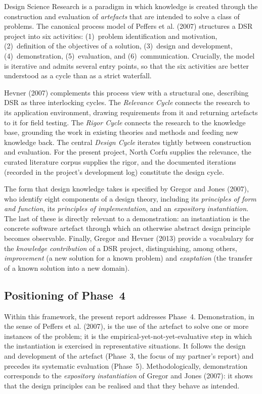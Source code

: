 \documentclass[11pt,a4paper]{article}
\begin{document}
Design Science Research is a paradigm in which knowledge is created through the construction and evaluation of \emph{artefacts} that are intended to solve a class of problems. The canonical process model of Peffers et al. (2007) structures a DSR project into six activities: (1)~problem identification and motivation, (2)~definition of the objectives of a solution, (3)~design and development, (4)~demonstration, (5)~evaluation, and (6)~communication. Crucially, the model is iterative and admits several entry points, so that the six activities are better understood as a cycle than as a strict waterfall.

Hevner (2007) complements this process view with a structural one, describing DSR as three interlocking cycles. The \emph{Relevance Cycle} connects the research to its application environment, drawing requirements from it and returning artefacts to it for field testing. The \emph{Rigor Cycle} connects the research to the knowledge base, grounding the work in existing theories and methods and feeding new knowledge back. The central \emph{Design Cycle} iterates tightly between construction and evaluation. For the present project, North Corfu supplies the relevance, the curated literature corpus supplies the rigor, and the documented iterations (recorded in the project's development log) constitute the design cycle.

The form that design knowledge takes is specified by Gregor and Jones (2007), who identify eight components of a design theory, including its \emph{principles of form and function}, its \emph{principles of implementation}, and an \emph{expository instantiation}. The last of these is directly relevant to a demonstration: an instantiation is the concrete software artefact through which an otherwise abstract design principle becomes observable. Finally, Gregor and Hevner (2013) provide a vocabulary for the \emph{knowledge contribution} of a DSR project, distinguishing, among others, \emph{improvement} (a new solution for a known problem) and \emph{exaptation} (the transfer of a known solution into a new domain).

\subsection{Positioning of Phase~4}

Within this framework, the present report addresses Phase~4. Demonstration, in the sense of Peffers et al. (2007), is the use of the artefact to solve one or more instances of the problem; it is the empirical-yet-not-yet-evaluative step in which the instantiation is exercised in representative situations. It follows the design and development of the artefact (Phase~3, the focus of my partner's report) and precedes its systematic evaluation (Phase~5). Methodologically, demonstration corresponds to the \emph{expository instantiation} of Gregor and Jones (2007): it shows that the design principles can be realised and that they behave as intended.
\end{document}
